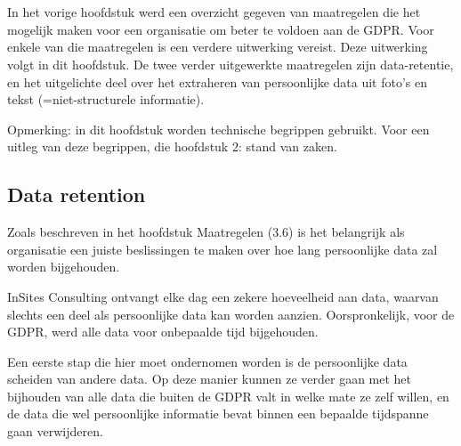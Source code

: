 
\chapter{}
\label{ch:methodologie}
In het vorige hoofdstuk werd een overzicht gegeven van maatregelen die het mogelijk maken voor een organisatie om beter te voldoen aan de GDPR. Voor enkele van die maatregelen is een verdere uitwerking vereist. Deze uitwerking volgt in dit hoofdstuk.  
De twee verder uitgewerkte maatregelen zijn data-retentie, en het uitgelichte deel over het extraheren van persoonlijke data uit foto's en tekst (=niet-structurele informatie). 

Opmerking: in dit hoofdstuk worden technische begrippen gebruikt. Voor een uitleg van deze begrippen, die hoofdstuk 2: stand van zaken. 


\section{Data retention}

Zoals beschreven in het hoofdstuk Maatregelen (3.6) is het belangrijk als organisatie een juiste beslissingen te maken over hoe lang persoonlijke data zal worden bijgehouden. 

InSites Consulting ontvangt elke dag een zekere hoeveelheid aan data, waarvan slechts een deel als persoonlijke data kan worden aanzien. Oorspronkelijk, voor de GDPR, werd alle data voor onbepaalde tijd bijgehouden. 

Een eerste stap die hier moet ondernomen worden is de persoonlijke data scheiden van andere data. Op deze manier kunnen ze verder gaan met het bijhouden van alle data die buiten de GDPR valt in welke mate ze zelf willen, en de data die wel persoonlijke informatie bevat binnen een bepaalde tijdspanne gaan verwijderen. 

